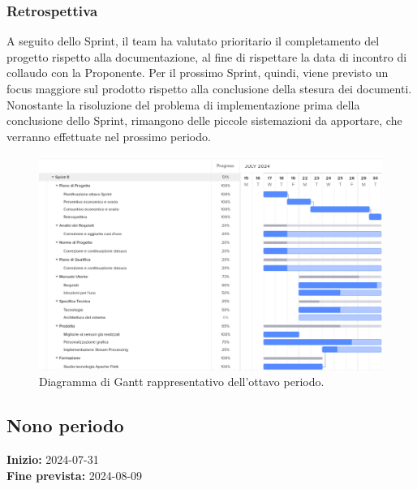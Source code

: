 \documentclass[8pt]{article}
\begin{document}
\subsubsection{Retrospettiva}
A seguito dello Sprint, il team ha valutato prioritario il completamento del progetto rispetto alla documentazione, al fine di rispettare la data di incontro di collaudo con la Proponente. Per il prossimo Sprint, quindi, viene previsto un focus maggiore sul prodotto rispetto alla conclusione della stesura dei documenti. Nonostante la risoluzione del problema di implementazione prima della conclusione dello Sprint, rimangono delle piccole sistemazioni da apportare, che verranno effettuate nel prossimo periodo.
\begin{figure}[h!]
    \centering
    \includegraphics[width=13cm]{./images_pdp/gantt8.png}
    \caption{Diagramma di Gantt rappresentativo dell'ottavo periodo.}
\end{figure}
\clearpage
\newpage
\subsection{Nono periodo}
\textbf{Inizio:} 2024-07-31\\
\textbf{Fine prevista:} 2024-08-09
\end{document}
